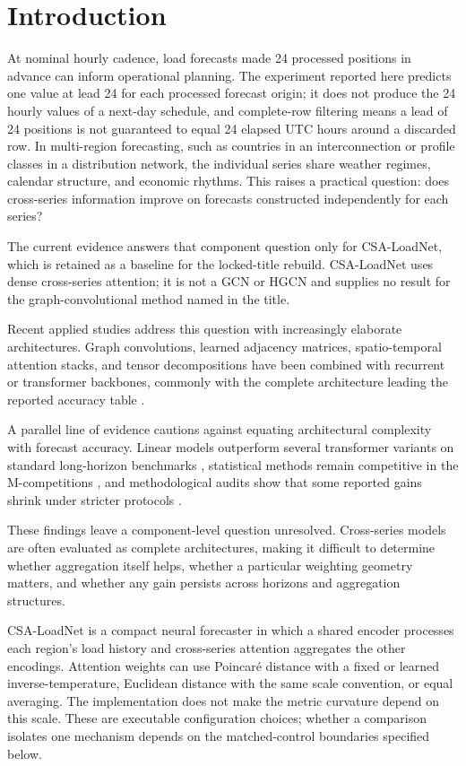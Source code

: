 \documentclass[electronics,article,submit,moreauthors]{Definitions/mdpi}
\begin{document}
\section{Introduction}\label{introduction}

At nominal hourly cadence, load forecasts made 24 processed positions in advance can inform operational planning. The experiment reported here predicts one value at lead 24 for each processed forecast origin; it does not produce the 24 hourly values of a next-day schedule, and complete-row filtering means a lead of 24 positions is not guaranteed to equal 24 elapsed UTC hours around a discarded row. In multi-region forecasting, such as countries in an interconnection or profile classes in a distribution network, the individual series share weather regimes, calendar structure, and economic rhythms. This raises a practical question: does cross-series information improve on forecasts constructed independently for each series?

The current evidence answers that component question only for CSA-LoadNet, which is retained as a baseline for the locked-title rebuild. CSA-LoadNet uses dense cross-series attention; it is not a GCN or HGCN and supplies no result for the graph-convolutional method named in the title.

Recent applied studies address this question with increasingly elaborate architectures. Graph convolutions, learned adjacency matrices, spatio-temporal attention stacks, and tensor decompositions have been combined with recurrent or transformer backbones, commonly with the complete architecture leading the reported accuracy table \cite{ref1,ref2,ref3,ref4}.

A parallel line of evidence cautions against equating architectural complexity with forecast accuracy. Linear models outperform several transformer variants on standard long-horizon benchmarks \cite{ref5}, statistical methods remain competitive in the M-competitions \cite{ref6,ref7}, and methodological audits show that some reported gains shrink under stricter protocols \cite{ref8}.

These findings leave a component-level question unresolved. Cross-series models are often evaluated as complete architectures, making it difficult to determine whether aggregation itself helps, whether a particular weighting geometry matters, and whether any gain persists across horizons and aggregation structures.

CSA-LoadNet is a compact neural forecaster in which a shared encoder processes each region's load history and cross-series attention aggregates the other encodings. Attention weights can use Poincar\'{e} distance with a fixed or learned inverse-temperature, Euclidean distance with the same scale convention, or equal averaging. The implementation does not make the metric curvature depend on this scale. These are executable configuration choices; whether a comparison isolates one mechanism depends on the matched-control boundaries specified below.
\end{document}
